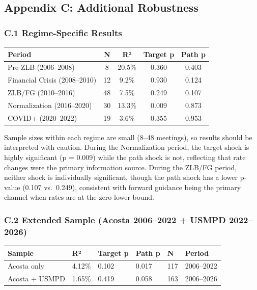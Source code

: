 \documentclass[
]{article}
\begin{document}
\subsection{Appendix C: Additional
Robustness}\label{appendix-c-additional-robustness}

\subsubsection{C.1 Regime-Specific
Results}\label{c.1-regime-specific-results}

\begin{longtable}[]{@{}lcccc@{}}
\toprule\noalign{}
Period & N & R² & Target p & Path p \\
\midrule\noalign{}
\endhead
\bottomrule\noalign{}
\endlastfoot
Pre-ZLB (2006--2008) & 8 & 20.5\% & 0.360 & 0.403 \\
Financial Crisis (2008--2010) & 12 & 9.2\% & 0.930 & 0.124 \\
ZLB/FG (2010--2016) & 48 & 7.5\% & 0.249 & 0.107 \\
Normalization (2016--2020) & 30 & 13.3\% & 0.009 & 0.873 \\
COVID+ (2020--2022) & 19 & 3.6\% & 0.355 & 0.953 \\
\end{longtable}

Sample sizes within each regime are small (8--48 meetings), so results
should be interpreted with caution. During the Normalization period, the
target shock is highly significant (p = 0.009) while the path shock is
not, reflecting that rate changes were the primary information source.
During the ZLB/FG period, neither shock is individually significant,
though the path shock has a lower p-value (0.107 vs.~0.249), consistent
with forward guidance being the primary channel when rates are at the
zero lower bound.

\subsubsection{C.2 Extended Sample (Acosta 2006--2022 + USMPD
2022--2026)}\label{c.2-extended-sample-acosta-20062022-usmpd-20222026}

\begin{longtable}[]{@{}llllll@{}}
\toprule\noalign{}
Sample & R² & Target p & Path p & N & Period \\
\midrule\noalign{}
\endhead
\bottomrule\noalign{}
\endlastfoot
Acosta only & 4.12\% & 0.102 & 0.017 & 117 & 2006--2022 \\
Acosta + USMPD & 1.65\% & 0.419 & 0.058 & 163 & 2006--2026 \\
\end{longtable}
\end{document}
